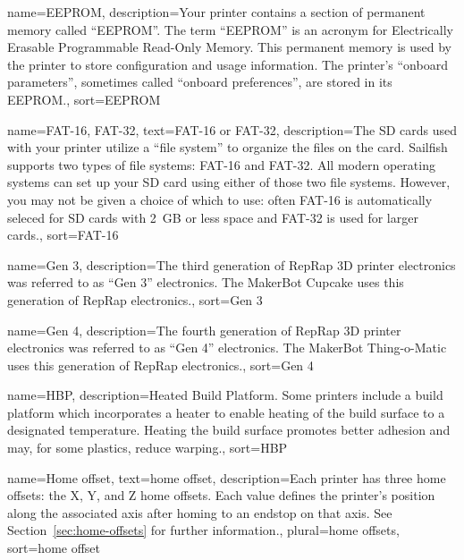 {
        name={EEPROM},
        description={Your printer contains a section of permanent memory
called ``EEPROM''.  The term ``EEPROM'' is an acronym for
Electrically Erasable Programmable Read-Only Memory.  This permanent
memory is used by the printer to store configuration and usage
information.  The printer's ``onboard parameters'', sometimes called
``onboard preferences'', are stored in its EEPROM.},
        sort=EEPROM
}

{
        name={FAT-16, FAT-32},
        text={FAT-16 or FAT-32},
        description={The SD cards used with your printer utilize a ``file system''
to organize the files on the card.  Sailfish supports two types of
file systems: FAT-16 and FAT-32.  All modern operating systems can set up
your SD card using either of those two file systems.  However, you may
not be given a choice of which to use: often FAT-16 is automatically
seleced for SD cards with 2~GB or less space and FAT-32 is used for
larger cards.},
        sort=FAT-16
}


{
        name={Gen 3},
        description={The third generation of RepRap 3D printer electronics
was referred to as ``Gen 3'' electronics.  The MakerBot Cupcake uses this
generation of RepRap electronics.},
         sort=Gen 3
}

{
        name={Gen 4},
        description={The fourth generation of RepRap 3D printer electronics
was referred to as ``Gen 4'' electronics.  The MakerBot Thing-o-Matic uses this
generation of RepRap electronics.},
         sort=Gen 4
}

{
        name={HBP},
        description={Heated Build Platform.  Some printers include a
build platform which incorporates a heater to enable heating of the build
surface to a designated temperature.  Heating the build surface promotes
better adhesion and may, for some plastics, reduce warping.},
        sort=HBP
}

{
        name={Home offset},
        text={home offset},
        description={Each printer has three home offsets: the X, Y, and Z
home offsets.  Each value defines the printer's position along the associated
axis after homing to an endstop on that axis.  See
Section~\ref{sec:home-offsets} for further information.},
        plural={home offsets},
        sort=home offset
}

